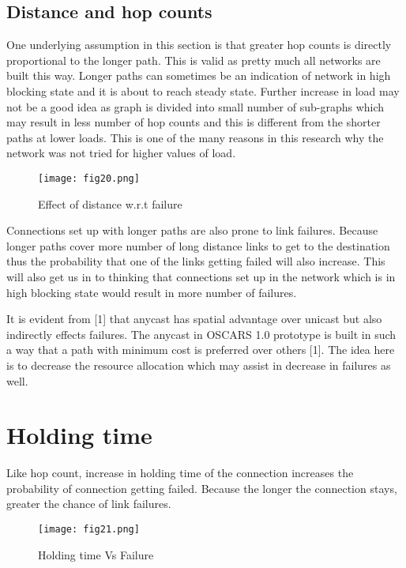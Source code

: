 \subsection {Distance and hop counts}
One underlying assumption in this section is that greater hop counts is directly proportional to the longer path. This is valid as pretty much all networks are built this way. Longer paths can sometimes be an indication of network in high blocking state and it is about to reach steady state. Further increase in load may not be a good idea as graph is divided into small number of sub-graphs which may result in less number of hop counts and this is different from the shorter paths at lower loads. This is one of the many reasons in this research why the network was not tried for higher values of load.

\begin{figure}[hbt!]
\centering
\texttt{[image: fig20.png]}
\caption{Effect of distance w.r.t failure}
\label{fig:distanceFailure}
\end{figure}


\indent Connections set up with longer paths are also prone to link failures. Because longer paths cover more number of long distance links to get to the destination thus the probability that one of the links getting failed will also increase. This will also get us in to thinking that connections set up in the network which is in high blocking state would result in more number of failures.

\indent It is evident from [1] that anycast has spatial advantage over unicast but also indirectly effects failures. The anycast in OSCARS 1.0 prototype is built in such a way that a path with minimum cost is preferred over others [1].  The idea here is to decrease the resource allocation which may assist in decrease in failures as well.
	
\section {Holding time}
Like hop count, increase in holding time of the connection increases the probability of connection getting failed. Because the longer the connection stays, greater the chance of link failures. 

\begin{figure}[hbt!]
\centering
\texttt{[image: fig21.png]}
\caption{Holding time Vs Failure}
\label{fig:holdFail}
\end{figure}



